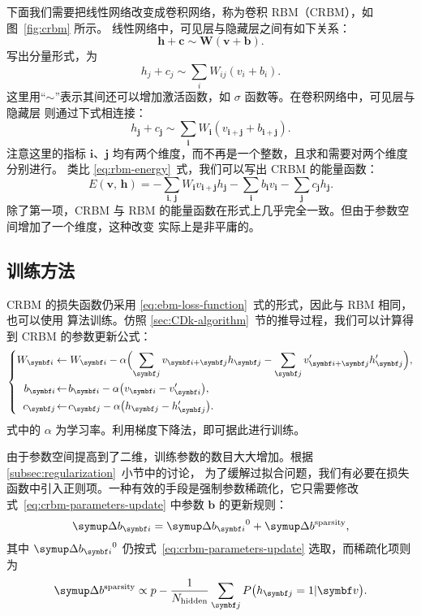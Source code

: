 下面我们需要把线性网络改变成卷积网络，称为卷积 RBM（CRBM），如图~\ref{fig:crbm} 所示。
线性网络中，可见层与隐藏层之间有如下关系：
\begin{equation}
  \bm{h}+\bm{c} \sim \bm{W} (\bm{v}+\bm{b}).
\end{equation}
写出分量形式，为
\begin{equation}
  h_j+c_j \sim \sum_i W_{ij} (v_i+b_i).
\end{equation}
这里用“$\sim$”表示其间还可以增加激活函数，如 $\sigma$ 函数等。在卷积网络中，可见层与隐藏层
则通过下式相连接：
\begin{equation}
  h_{\bm{j}} + c_{\bm{j}} \sim \sum_{\bm{i}} W_{\bm{i}} (v_{\bm{i}+\bm{j}} + b_{\bm{i}+\bm{j}}).
\end{equation}
注意这里的指标 $\bm{i}$、$\bm{j}$ 均有两个维度，而不再是一个整数，且求和需要对两个维度分别进行。
类比 \eqref{eq:rbm-energy}~式，我们可以写出 CRBM 的能量函数：
\begin{equation}
  E(\bm{v},\,\bm{h})
  = - \sum_{\bm{i},\,\bm{j}} W_{\bm{i}} v_{\bm{i}+\bm{j}} h_{\bm{j}}
    - \sum_{\bm{i}} b_{\bm{i}} v_{\bm{i}} - \sum_{\bm{j}} c_{\bm{j}} h_{\bm{j}}.
\end{equation}
除了第一项，CRBM 与 RBM 的能量函数在形式上几乎完全一致。但由于参数空间增加了一个维度，这种改变
实际上是非平庸的。

\subsection{训练方法}

CRBM 的损失函数仍采用 \eqref{eq:ebm-loss-function}~式的形式，因此与 RBM 相同，也可以使用 \CDk{}
算法训练。仿照 \ref{sec:CDk-algorithm}~节的推导过程，我们可以计算得到 CRBM 的参数更新公式：
\begin{equation}
  \label{eq:crbm-parameters-update}
  \left\{
  \begin{aligned}
    W_{\bm{i}}    &\gets W_{\bm{i}} - \alpha
                         \qty\Big(  \sum_{\bm{j}} v_{\bm{i}+\bm{j}} h_{\bm{j}}
                                  - \sum_{\bm{j}} v'_{\bm{i}+\bm{j}} h'_{\bm{j}}), \\
    b_{\bm{i}} \! &\gets \! b_{\bm{i}} - \alpha \qty\big(v_{\bm{i}} - v'_{\bm{i}}),   \\
    c_{\bm{j}} \! &\gets \! c_{\bm{j}} - \alpha \qty\big(h_{\bm{j}} - h'_{\bm{j}}).
  \end{aligned}
  \right.
\end{equation}
式中的 $\alpha$ 为学习率。利用梯度下降法，即可据此进行训练。

由于参数空间提高到了二维，训练参数的数目大大增加。根据 \ref{subsec:regularization}~小节中的讨论，
为了缓解过拟合问题，我们有必要在损失函数中引入正则项。一种有效的手段是强制参数稀疏化，它只需要修改
式~\eqref{eq:crbm-parameters-update} 中参数 $\bm{b}$ 的更新规则：
\begin{equation}
  \incr{b_{\bm{i}}} = \incr{b_{\bm{i}}}^0 + \incr{b}^{\text{sparsity}},
\end{equation}
其中 $\incr{b_{\bm{i}}}^0$ 仍按式~\eqref{eq:crbm-parameters-update} 选取，而稀疏化项则为
\begin{equation}
  \incr{b}^{\text{sparsity}}
  \propto p - \frac{1}{N_{\text{hidden}}} \sum_{\bm{j}} P\qty\big(h_{\bm{j}}=1|\bm{v}).
\end{equation}
